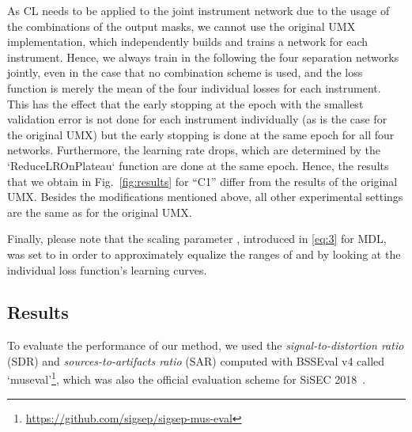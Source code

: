\documentclass{article}
\begin{document}
As CL needs to be applied to the joint instrument network due to the usage of the combinations of the output masks, we cannot use the original UMX implementation, which independently builds and trains a network for each instrument.
Hence, we always train in the following the four separation networks jointly, even in the case that no combination scheme is used, and the loss function is merely the mean of the four individual losses for each instrument.
This has the effect that the early stopping at the epoch with the smallest validation error is not done for each instrument individually (as is the case for the original UMX) but the early stopping is done at the same epoch for all four networks.
Furthermore, the learning rate drops, which are determined by the `ReduceLROnPlateau` function are done at the same epoch.
Hence, the results that we obtain in Fig.~\ref{fig:results} for ``C1'' differ from the results of the original UMX.
Besides the modifications mentioned above, all other experimental settings are the same as for the original UMX.


Finally, please note that the scaling parameter , introduced in \eqref{eq:3} for MDL, was set to  in order to approximately equalize the ranges of  and  by looking at the individual loss function's learning curves.

\subsection{Results}
\label{subsec:results}
To evaluate the performance of our method, we used the \emph{signal-to-distortion ratio} (SDR) and \emph{sources-to-artifacts ratio} (SAR) computed with BSSEval v4 called `museval'\footnote{\url{https://github.com/sigsep/sigsep-mus-eval}}, which was also the official evaluation scheme for SiSEC 2018~\cite{stoter20182018}.
\begin{table}[tb]
\centering
\caption{Comparison of X-UMX with other public methods in terms of SDR (``median of frames, median of tracks'').}
\vspace{-1mm}
\vspace{-3mm}
\end{table}
\end{document}
